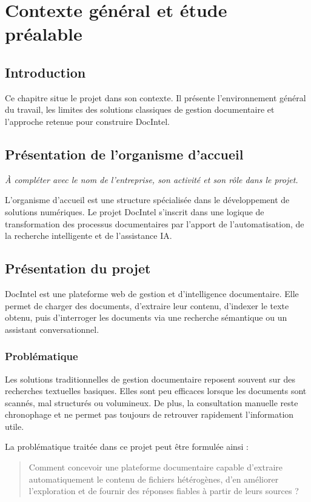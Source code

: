 \documentclass[12pt,a4paper]{report}
\begin{document}
\chapter{Contexte général et étude préalable}

\section{Introduction}
Ce chapitre situe le projet dans son contexte. Il présente l'environnement général du travail, les limites des solutions classiques de gestion documentaire et l'approche retenue pour construire DocIntel.

\section{Pr\'esentation de l'organisme d'accueil}
\textit{À compléter avec le nom de l'entreprise, son activité et son rôle dans le projet.}

L'organisme d'accueil est une structure spécialisée dans le développement de solutions numériques. Le projet DocIntel s'inscrit dans une logique de transformation des processus documentaires par l'apport de l'automatisation, de la recherche intelligente et de l'assistance IA.

\section{Pr\'esentation du projet}
DocIntel est une plateforme web de gestion et d'intelligence documentaire. Elle permet de charger des documents, d'extraire leur contenu, d'indexer le texte obtenu, puis d'interroger les documents via une recherche sémantique ou un assistant conversationnel.

\subsection{Probl\'ematique}
Les solutions traditionnelles de gestion documentaire reposent souvent sur des recherches textuelles basiques. Elles sont peu efficaces lorsque les documents sont scannés, mal structurés ou volumineux. De plus, la consultation manuelle reste chronophage et ne permet pas toujours de retrouver rapidement l'information utile.

La problématique traitée dans ce projet peut être formulée ainsi :

\begin{quote}
Comment concevoir une plateforme documentaire capable d'extraire automatiquement le contenu de fichiers hétérogènes, d'en améliorer l'exploration et de fournir des réponses fiables à partir de leurs sources ?
\end{quote}
\end{document}
